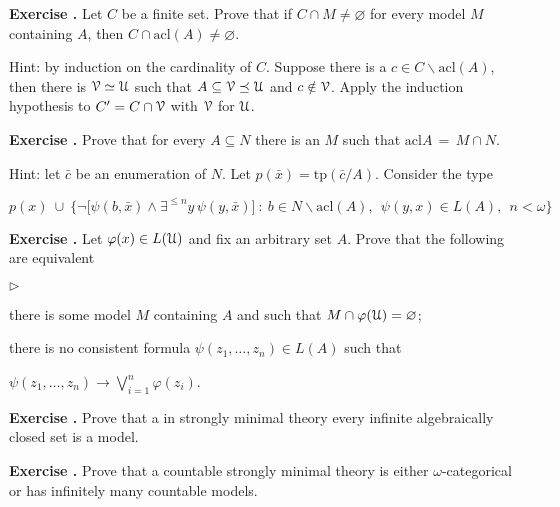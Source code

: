 \documentclass[10pt]{article}
\def\phi{\varphi}
\def\U{\EuScript U}
\def\V{\EuScript V}
\def\sm{\smallsetminus}
\def\E{\exists}
\def\0{\varnothing}
\def\imp{\rightarrow}
\def\acl{\textrm{acl}}
\def\tp{\textrm{tp}}
\newcommand{\labella}[1]{{\sf\footnotesize #1}\hfill}
\renewenvironment{itemize}
  {\begin{list}{$\triangleright$}{%
   \setlength{\parskip}{0mm}
   \setlength{\topsep}{0mm}
   \setlength{\rightmargin}{0mm}
   \setlength{\listparindent}{0mm}
   \setlength{\itemindent}{0mm}
   \setlength{\labelwidth}{3ex}
   \setlength{\itemsep}{0mm}
   \setlength{\parsep}{0mm}
   \setlength{\partopsep}{0mm}
   \setlength{\labelsep}{1ex}
   \setlength{\leftmargin}{\labelwidth+\labelsep}
   \let\makelabel\labella}}{%
   \end{list}}
\newcounter{ex}
\newenvironment{exercise}{\bigskip\addtocounter{ex}{1}\textbf{Exercise \theex.\quad}}{}
\begin{document}
\begin{exercise}\label{pofu2}
Let $C$ be a finite set. Prove that if $C\cap M\neq\0$ for every model $M$ containing $A$, then $C\cap\acl(A)\neq\0$.

Hint: by induction on the cardinality of $C$. Suppose there is a $c\in C\sm\acl(A)$, then there is $\V\simeq\U$ such that $A\subseteq\V\preceq\U$ and $c\notin\V$. Apply the induction hypothesis to $C'=C\cap\V$ with $\V$ for $\U$.
\end{exercise}


\begin{exercise}\label{ex_acl_intersezioe_2_modelli}
Prove that for every $A\subseteq N$ there is an $M$ such that $\acl A\,=\,M\cap N$.

Hint: let $\bar c$ be an enumeration of $N$. Let $p(\bar x)=\tp(\bar c/A)$. Consider the type

\hfil$p(x)\ \cup\ \Big\{\neg\big[\psi(b,\bar x)\wedge\E^{\le n}y\,\psi(y,\bar x)\big]\ :\ b\in N\sm\acl(A),\ \ \psi(y,x)\in L(A),\ \ n<\omega\Big\}$
\end{exercise}

\begin{exercise}
Let $\phi(x)\in L(\U)$ and fix an arbitrary set $A$. Prove that the following are equivalent
\begin{itemize}
\item[1.] there is some model $M$ containing $A$ and such that $M\cap\phi(\U)=\0$;
\item[2.] there is no consistent formula $\psi(z_1,\dots,z_n)\in L(A)$ such that

 \hfil$\displaystyle\psi(z_1,\dots,z_n)\imp\bigvee^n_{i=1}\phi(z_i)$.
\end{itemize}
\end{exercise}


\begin{exercise}
Prove that a in  strongly minimal theory every infinite algebraically closed set is a model.
\end{exercise}

\begin{exercise}
Prove that a countable strongly minimal theory is either $\omega$-categorical or has infinitely many countable models.
\end{exercise}
\end{document}
